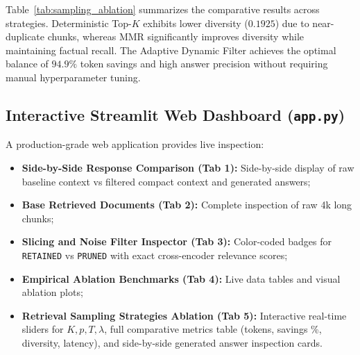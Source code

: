 \documentclass[10pt,journal,compsoc]{IEEEtran}
\begin{document}
Table~\ref{tab:sampling_ablation} summarizes the comparative results across strategies. Deterministic Top-$K$ exhibits lower diversity ($0.1925$) due to near-duplicate chunks, whereas MMR significantly improves diversity while maintaining factual recall. The Adaptive Dynamic Filter achieves the optimal balance of $94.9\%$ token savings and high answer precision without requiring manual hyperparameter tuning.

\begin{table}[!h]
\caption{Retrieval Sampling Strategies Ablation Results}
\label{tab:sampling_ablation}
\centering
{}
\end{table}

\subsection{Interactive Streamlit Web Dashboard (\texttt{app.py})}
A production-grade web application provides live inspection:
\begin{itemize}
    \item \textbf{Side-by-Side Response Comparison (Tab 1):} Side-by-side display of raw baseline context vs filtered compact context and generated answers;
    \item \textbf{Base Retrieved Documents (Tab 2):} Complete inspection of raw 4k long chunks;
    \item \textbf{Slicing and Noise Filter Inspector (Tab 3):} Color-coded badges for \texttt{RETAINED} vs \texttt{PRUNED} with exact cross-encoder relevance scores;
    \item \textbf{Empirical Ablation Benchmarks (Tab 4):} Live data tables and visual ablation plots;
    \item \textbf{Retrieval Sampling Strategies Ablation (Tab 5):} Interactive real-time sliders for $K, p, T, \lambda$, full comparative metrics table (tokens, savings \%, diversity, latency), and side-by-side generated answer inspection cards.
\end{itemize}
\end{document}
